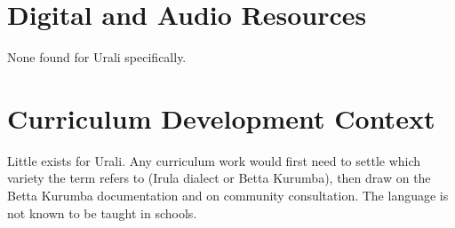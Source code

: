 \documentclass[12pt]{article}
\begin{document}
\section{Digital and Audio Resources}
None found for Urali specifically.
\section{Curriculum Development Context}
Little exists for Urali. Any curriculum work would first need to settle which variety the term refers to (Irula dialect or Betta Kurumba), then draw on the Betta Kurumba documentation and on community consultation. The language is not known to be taught in schools.
\end{document}
